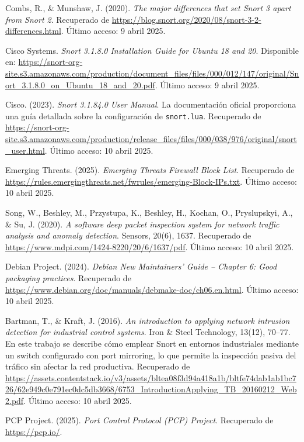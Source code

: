 \documentclass[11pt,a4paper,twoside]{report}
\begin{document}
\begin{thebibliography}{35}
	Combs, R., \& Munshaw, J. (2020). \textit{The major differences that set Snort 3 apart from Snort 2}. Recuperado de \url{https://blog.snort.org/2020/08/snort-3-2-differences.html}. Último acceso: 9 abril 2025.
	
	Cisco Systems. \textit{Snort 3.1.8.0 Installation Guide for Ubuntu 18 and 20}. Disponible en: \url{https://snort-org-site.s3.amazonaws.com/production/document_files/files/000/012/147/original/Snort_3.1.8.0_on_Ubuntu_18_and_20.pdf}. Último acceso: 9 abril 2025.
	
	Cisco. (2023). \textit{Snort 3.1.84.0 User Manual}. La documentación oficial proporciona una guía detallada sobre la configuración de \texttt{snort.lua}. Recuperado de \url{https://snort-org-site.s3.amazonaws.com/production/release_files/files/000/038/976/original/snort_user.html}. Último acceso: 10 abril 2025.
	
	 Emerging Threats. (2025). \textit{Emerging Threats Firewall Block List}. Recuperado de \url{https://rules.emergingthreats.net/fwrules/emerging-Block-IPs.txt}. Último acceso: 10 abril 2025.
	
	Song, W., Beshley, M., Przystupa, K., Beshley, H., Kochan, O., Pryslupskyi, A., \& Su, J. (2020). \textit{A software deep packet inspection system for network traffic analysis and anomaly detection}. Sensors, 20(6), 1637. Recuperado de \url{https://www.mdpi.com/1424-8220/20/6/1637/pdf}. Último acceso: 10 abril 2025.
	
	Debian Project. (2024). \textit{Debian New Maintainers’ Guide – Chapter 6: Good packaging practices}. Recuperado de \url{https://www.debian.org/doc/manuals/debmake-doc/ch06.en.html}. Último acceso: 10 abril 2025.
	
	Bartman, T., \& Kraft, J. (2016). \textit{An introduction to applying network intrusion detection for industrial control systems}. Iron \& Steel Technology, 13(12), 70--77. En este trabajo se describe cómo emplear Snort en entornos industriales mediante un switch configurado con port mirroring, lo que permite la inspección pasiva del tráfico sin afectar la red productiva. Recuperado de \url{https://assets.contentstack.io/v3/assets/bltea08f3d94a418a1b/bltfe74dab1ab1bc726/62e949c0e791ec0dc5db3668/6753_IntroductionApplying_TB_20160212_Web2.pdf}. Último acceso: 10 abril 2025.
	

 PCP Project. (2025). \textit{Port Control Protocol (PCP) Project}. Recuperado de \url{https://pcp.io/}.
	
\end{thebibliography}
\end{document}
